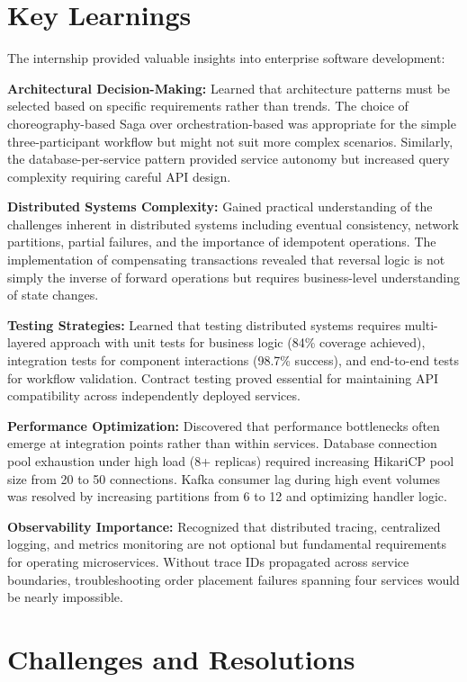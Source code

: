 \section{Key Learnings}

The internship provided valuable insights into enterprise software development:

\textbf{Architectural Decision-Making:} Learned that architecture patterns must be selected based on specific requirements rather than trends. The choice of choreography-based Saga over orchestration-based was appropriate for the simple three-participant workflow but might not suit more complex scenarios. Similarly, the database-per-service pattern provided service autonomy but increased query complexity requiring careful API design.

\textbf{Distributed Systems Complexity:} Gained practical understanding of the challenges inherent in distributed systems including eventual consistency, network partitions, partial failures, and the importance of idempotent operations. The implementation of compensating transactions revealed that reversal logic is not simply the inverse of forward operations but requires business-level understanding of state changes.

\textbf{Testing Strategies:} Learned that testing distributed systems requires multi-layered approach with unit tests for business logic (84\% coverage achieved), integration tests for component interactions (98.7\% success), and end-to-end tests for workflow validation. Contract testing proved essential for maintaining API compatibility across independently deployed services.

\textbf{Performance Optimization:} Discovered that performance bottlenecks often emerge at integration points rather than within services. Database connection pool exhaustion under high load (8+ replicas) required increasing HikariCP pool size from 20 to 50 connections. Kafka consumer lag during high event volumes was resolved by increasing partitions from 6 to 12 and optimizing handler logic.

\textbf{Observability Importance:} Recognized that distributed tracing, centralized logging, and metrics monitoring are not optional but fundamental requirements for operating microservices. Without trace IDs propagated across service boundaries, troubleshooting order placement failures spanning four services would be nearly impossible.

\section{Challenges and Resolutions}

